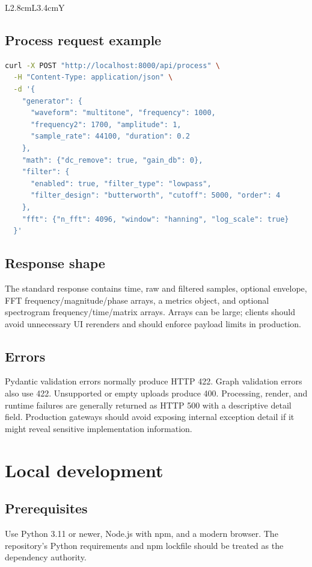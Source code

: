 \documentclass[10pt,a4paper]{article}
\begin{document}
\begin{tabularx}{\textwidth}{L{2.8cm}L{3.4cm}Y}
\subsection{Process request example}

\begin{lstlisting}[language=bash]
curl -X POST "http://localhost:8000/api/process" \
  -H "Content-Type: application/json" \
  -d '{
    "generator": {
      "waveform": "multitone", "frequency": 1000,
      "frequency2": 1700, "amplitude": 1,
      "sample_rate": 44100, "duration": 0.2
    },
    "math": {"dc_remove": true, "gain_db": 0},
    "filter": {
      "enabled": true, "filter_type": "lowpass",
      "filter_design": "butterworth", "cutoff": 5000, "order": 4
    },
    "fft": {"n_fft": 4096, "window": "hanning", "log_scale": true}
  }'
\end{lstlisting}

\subsection{Response shape}

The standard response contains time, raw and filtered samples, optional envelope, FFT frequency/magnitude/phase arrays, a metrics object, and optional spectrogram frequency/time/matrix arrays. Arrays can be large; clients should avoid unnecessary UI rerenders and should enforce payload limits in production.

\subsection{Errors}

Pydantic validation errors normally produce HTTP 422. Graph validation errors also use 422. Unsupported or empty uploads produce 400. Processing, render, and runtime failures are generally returned as HTTP 500 with a descriptive detail field. Production gateways should avoid exposing internal exception detail if it might reveal sensitive implementation information.

\section{Local development}

\subsection{Prerequisites}

Use Python 3.11 or newer, Node.js with npm, and a modern browser. The repository's Python requirements and npm lockfile should be treated as the dependency authority.


\end{tabularx}
\end{document}
